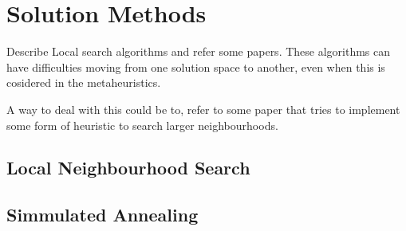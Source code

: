 \documentclass[../main.tex]{subfiles}
\begin{document}
                                                
\chapter{Solution Methods}
\label{ch:solMeth}

Describe Local search algorithms and refer some papers. 
These algorithms can have difficulties moving from one solution space to another, even when this is cosidered in the metaheuristics. \par
A way to deal with this could be to, refer to some paper that tries to implement some form of heuristic to search larger neighbourhoods.

\section{Local Neighbourhood Search}
\label{sec:lns}

\section{Simmulated Annealing}
\label{sec:sima}

\biblio
\end{document}
